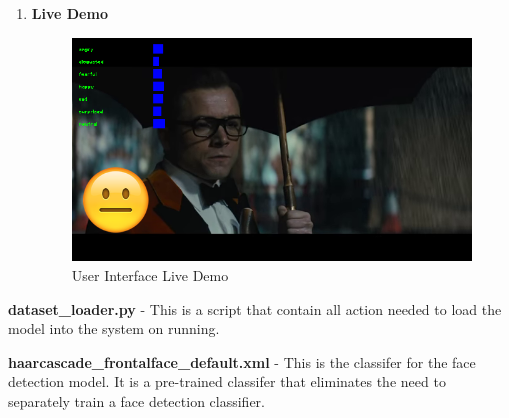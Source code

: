 \begin{enumerate}
	\item \textbf{Live Demo}
	\begin{figure}[h]
		\centering\includegraphics[scale=0.74]{images/angry_ui.png}
		\caption{User Interface Live Demo}
	\end{figure}
\end{enumerate} 

\textbf{dataset\_loader.py} - This is a script that contain all action needed to load the model into the system on running.

\textbf{haarcascade\_frontalface\_default.xml} - This is the classifer for the face detection model. It is a pre-trained classifer that eliminates the need to separately train a face detection classifier.